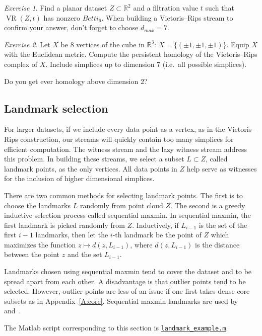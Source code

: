 \documentclass[amscd, amssymb, verbatim]{amsart}[12pt]
\theoremstyle{remark}
\newtheorem{exercise}{Exercise}
\theoremstyle{remark}
\theoremstyle{remark}
\DeclareMathOperator{\VR}{VR}
\newcommand{\R}{\mathbb{R}}
\begin{document}
\begin{exercise}
Find a planar dataset $Z \subset \R^2$ and a filtration value $t$ such that $\VR(Z,t)$ has nonzero $Betti_6$. When building a Vietoris--Rips stream to confirm your answer, don't forget to choose $d_{max} = 7$. 
\end{exercise}

\begin{exercise}
Let $X$ be 8 vertices of the cube in $\R^3$: $X=\{(\pm1, \pm1, \pm1)\}$. Equip $X$ with the Euclidean metric. Compute the persistent homology of the Vietoris--Rips complex of $X$. Include simplices up to dimension 7 (i.e.\ all possible simplices).

Do you get ever homology above dimension 2?
\end{exercise}


\subsection{Landmark selection}\label{SS:landmarks}
For larger datasets, if we include every data point as a vertex, as in the Vietoris--Rips construction, our streams will quickly contain too many simplices for efficient computation. The witness stream and the lazy witness stream address this problem. In building these streams, we select a subset $L \subset Z$, called landmark points, as the only vertices. All data points in $Z$ help serve as witnesses for the inclusion of higher dimensional simplices. 

There are two common methods for selecting landmark points. The first is to choose the landmarks $L$ randomly from point cloud $Z$. The second is a greedy inductive selection process called sequential maxmin. In sequential maxmin, the first landmark is picked randomly from $Z$. Inductively, if $L_{i-1}$ is the set of the first $i-1$ landmarks, then let the $i$-th landmark be the point of $Z$ which maximizes the function $z \mapsto d(z, L_{i-1})$, where $d(z, L_{i-1})$ is the distance between the point $z$ and the set $L_{i-1}$. 

Landmarks chosen using sequential maxmin tend to cover the dataset and to be spread apart from each other. A disadvantage is that outlier points tend to be selected. However, outlier points are less of an issue if one first takes dense core subsets as in Appendix~\ref{A:core}. Sequential maxmin landmarks are used by~\citet{Range} and~\citet{KleinBottle}. 

The Matlab script corresponding to this section is \href{https://github.com/appliedtopology/javaplex/tree/master/src/matlab/for_distribution/tutorial_examples/landmark_example.m}{\texttt{landmark\_example.m}}.
\end{document}
